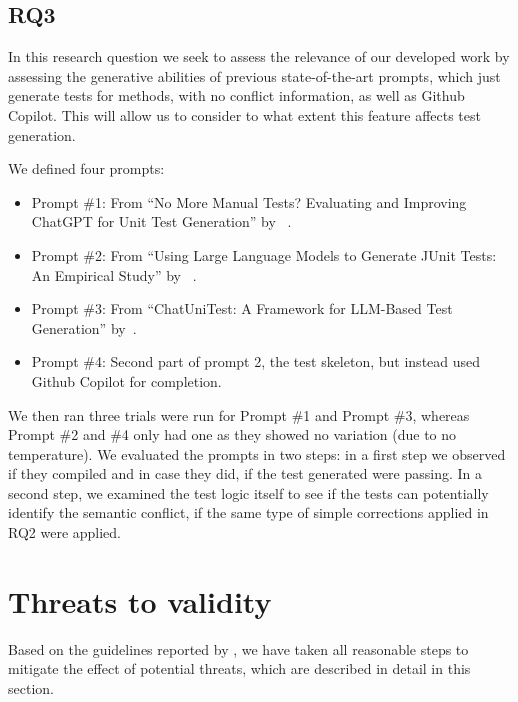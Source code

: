 \subsection{RQ3}

In this research question we seek to assess the relevance of our developed work by assessing the generative abilities of previous state-of-the-art prompts, which just generate tests for methods, with no conflict information, as well as Github Copilot. This will allow us to consider to what extent this feature affects test generation.

We defined four prompts:
\begin{itemize}
  \item Prompt \#1: From ``No More Manual Tests? Evaluating and Improving ChatGPT for Unit Test Generation'' by ~\citet{kn:chattester}.
  \item Prompt \#2: From ``Using Large Language Models to Generate JUnit Tests: An Empirical Study'' by ~\citet{kn:siddiq2023empirical}.
  \item Prompt \#3: From ``ChatUniTest: A Framework for LLM-Based Test Generation'' by~\citet{kn:chatunitest}.
  \item Prompt \#4: Second part of prompt 2, the test skeleton, but instead used Github Copilot for completion.
\end{itemize}
%
We then ran three trials were run for Prompt \#1 and Prompt \#3, whereas Prompt \#2 and \#4 only had one as they showed no variation (due to no temperature).
We evaluated the prompts in two steps: in a first step we observed if they compiled and in case they did, if the test generated were passing.
In a second step, we examined the test logic itself to see if the tests can potentially identify the semantic conflict, if the same type of simple corrections applied in RQ2 were applied.

\section{Threats to validity}


Based on the guidelines reported by \citet{wohlin2012experimentation}, we have
taken all reasonable steps to mitigate the effect of potential threats, which
are described in detail in this section.

